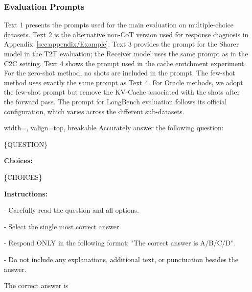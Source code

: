 \subsubsection{Evaluation Prompts}
\label{sec:appendix/prompts}
Text 1 presents the prompts used for the main evaluation on multiple-choice datasets.
Text 2 is the alternative non-CoT version used for response diagnosis in Appendix~\ref{sec:appendix/Example}.
Text 3 provides the prompt for the Sharer model in the T2T evaluation; the Receiver model uses the same prompt as in the C2C setting.
Text 4 shows the prompt used in the cache enrichment experiment. For the zero-shot method, no shots are included in the prompt. The few-shot method uses exactly the same prompt as Text 4. For Oracle methods, we adopt the few-shot prompt but remove the KV-Cache associated with the shots after the forward pass.
The prompt for LongBench evaluation follows its official configuration, which varies across the different sub-datasets.

\begin{bluebox}{width=\linewidth, valign=top, breakable}
\label{text:prompt_example}
Accurately answer the following question:

\vspace{0.8em}
 {\ttfamily\small
\{{{QUESTION}}\}}
\vspace{0.8em}

\medskip
\noindent\textbf{Choices:}

 {\ttfamily\small
\{{{CHOICES}}\}}
\vspace{0.8em}

\medskip
\noindent\textbf{Instructions:}

- Carefully read the question and all options.  \vspace{0.3em}  

- Select the single most correct answer.  \vspace{0.3em}  

- Respond ONLY in the following format: "The correct answer is A/B/C/D".  \vspace{0.3em}  

- Do not include any explanations, additional text, or punctuation besides the answer. \vspace{0.3em}  

The correct answer is
\end{bluebox}


